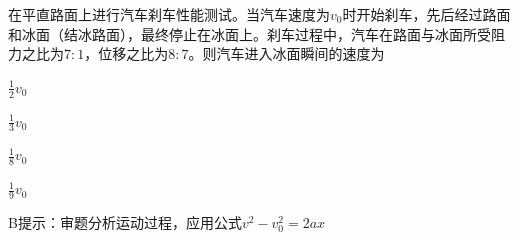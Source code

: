 在平直路面上进行汽车刹车性能测试。当汽车速度为\(v_0\)时开始刹车，先后经过路面和冰面（结冰路面），最终停止在冰面上。刹车过程中，汽车在路面与冰面所受阻力之比为\(7:1\)，位移之比为\(8:7\)。则汽车进入冰面瞬间的速度为\paren[]
\begin{choices}
	\item\(\frac{1}{2}v_0\)
	\item\(\frac{1}{3}v_0\)
	\item\(\frac{1}{8}v_0\)
	\item\(\frac{1}{9}v_0\)
\end{choices}
\begin{answer}
	B\qquad 提示：审题分析运动过程，应用公式\(v^2 - v_0^2 = 2ax\)
\end{answer}